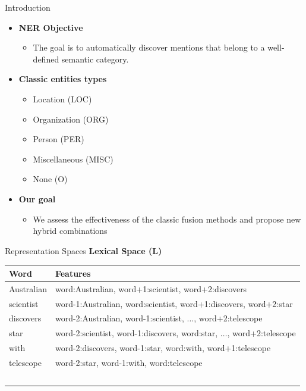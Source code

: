 \documentclass[10pt,xcolor=table]{beamer}
\begin{document}
\begin{frame}{Introduction}
\begin{itemize}[<+- | alert@+>]
\item \large \textbf{NER Objective}
\begin{itemize}
\item  The goal is to automatically discover  mentions that belong to a well-defined semantic category. 

\end{itemize}
\item \large \textbf{Classic entities types}
	\begin{itemize}
	\item Location (LOC)
	\item Organization (ORG)
	\item Person (PER)
	\item Miscellaneous (MISC)
	\item None (O)
	\end{itemize}
\item \large \textbf{Our goal}
\begin{itemize}
\item We assess the effectiveness of the classic fusion methods and propose new hybrid combinations 
\end{itemize}

\end{itemize}
\end{frame}

%


\begin{frame}{Representation Spaces}
\large \textbf{Lexical Space (L)}
\vspace{1cm}
\small

\begin{tabular}{ll}
	
	\hline 
	 \textbf{Word} & \textbf{Features} \\ 
	\hline 
	Australian & word:Australian, word+1:scientist, word+2:discovers\\ 
	scientist  &  word-1:Australian, word:scientist, word+1:discovers, word+2:star\\ 
	discovers & word-2:Australian, word-1:scientist, $\dots$, word+2:telescope \\ 
	star & word-2:scientist, word-1:discovers, word:star, $\dots$, word+2:telescope \\ 
	with & word-2:discovers, word-1:star, word:with, word+1:telescope \\ 
	telescope  &  word-2:star, word-1:with, word:telescope \\ 
	\hline \
\end{tabular} 
\vspace{\textheight}
\end{frame}
\end{document}
